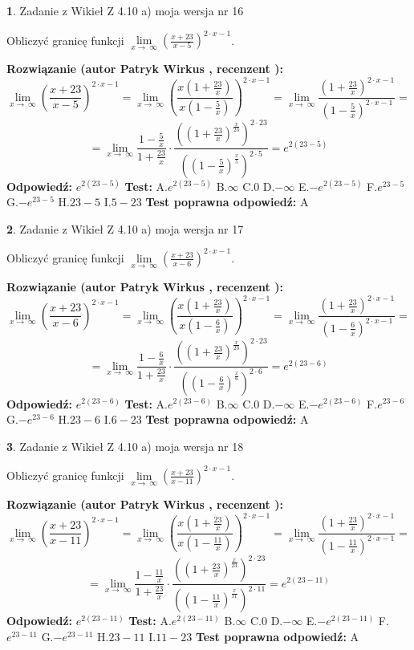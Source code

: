 \documentclass[12pt, a4paper]{article}
\theoremstyle{definition} %
\newtheorem{zad}{}
\newcommand{\zadStart}[1]{\begin{zad}#1\newline}
\newcommand{\zadStop}{\end{zad}}
\newcommand{\rozwStart}[2]{\noindent \textbf{Rozwiązanie (autor #1 , recenzent #2): }\newline}
\newcommand{\rozwStop}{\newline}
\newcommand{\odpStart}{\noindent \textbf{Odpowiedź:}\newline}
\newcommand{\odpStop}{\newline}
\newcommand{\testStart}{\noindent \textbf{Test:}\newline}
\newcommand{\testStop}{\newline}
\newcommand{\kluczStart}{\noindent \textbf{Test poprawna odpowiedź:}\newline}
\newcommand{\kluczStop}{\newline}
\begin{document}
\zadStart{Zadanie z Wikieł Z 4.10 a) moja wersja nr 16}


Obliczyć granicę funkcji  $\lim\limits_{x\to\ \infty}(\frac{x+23}{x-5})^{2\cdot x-1}$.
\zadStop
\rozwStart{Patryk Wirkus}{}
$$\lim\limits_{x\to\ \infty}(\frac{x+23}{x-5})^{2\cdot x-1} = \lim\limits_{x\to\ \infty}(\frac{x(1+\frac{23}{x})}{x(1-\frac{5}{x})})^{2\cdot x-1}=\lim\limits_{x\to\ \infty}\frac{(1+\frac{23}{x})^{2\cdot x-1}}{(1-\frac{5}{x})^{2\cdot x-1}}=$$
$$=\lim\limits_{x\to\ \infty}\frac{1-\frac{5}{x}}{1+\frac{23}{x}}\cdot\frac{((1+\frac{23}{x})^{\frac{x}{23}})^{2\cdot23}}{((1-\frac{5}{x})^{\frac{x}{5}})^{2\cdot5}}=e^{2(23-5)}$$
\rozwStop
\odpStart
$e^{2(23-5)}$
\odpStop
\testStart
A.$e^{2(23-5)}$ B.$\infty$ C.$0$ D.$-\infty$ E.$-e^{2(23-5)}$
F.$e^{23-5}$ G.$-e^{23-5}$
H.$23-5$
I.$5-23$
\testStop
\kluczStart
A
\kluczStop



\zadStart{Zadanie z Wikieł Z 4.10 a) moja wersja nr 17}


Obliczyć granicę funkcji  $\lim\limits_{x\to\ \infty}(\frac{x+23}{x-6})^{2\cdot x-1}$.
\zadStop
\rozwStart{Patryk Wirkus}{}
$$\lim\limits_{x\to\ \infty}(\frac{x+23}{x-6})^{2\cdot x-1} = \lim\limits_{x\to\ \infty}(\frac{x(1+\frac{23}{x})}{x(1-\frac{6}{x})})^{2\cdot x-1}=\lim\limits_{x\to\ \infty}\frac{(1+\frac{23}{x})^{2\cdot x-1}}{(1-\frac{6}{x})^{2\cdot x-1}}=$$
$$=\lim\limits_{x\to\ \infty}\frac{1-\frac{6}{x}}{1+\frac{23}{x}}\cdot\frac{((1+\frac{23}{x})^{\frac{x}{23}})^{2\cdot23}}{((1-\frac{6}{x})^{\frac{x}{6}})^{2\cdot6}}=e^{2(23-6)}$$
\rozwStop
\odpStart
$e^{2(23-6)}$
\odpStop
\testStart
A.$e^{2(23-6)}$ B.$\infty$ C.$0$ D.$-\infty$ E.$-e^{2(23-6)}$
F.$e^{23-6}$ G.$-e^{23-6}$
H.$23-6$
I.$6-23$
\testStop
\kluczStart
A
\kluczStop



\zadStart{Zadanie z Wikieł Z 4.10 a) moja wersja nr 18}


Obliczyć granicę funkcji  $\lim\limits_{x\to\ \infty}(\frac{x+23}{x-11})^{2\cdot x-1}$.
\zadStop
\rozwStart{Patryk Wirkus}{}
$$\lim\limits_{x\to\ \infty}(\frac{x+23}{x-11})^{2\cdot x-1} = \lim\limits_{x\to\ \infty}(\frac{x(1+\frac{23}{x})}{x(1-\frac{11}{x})})^{2\cdot x-1}=\lim\limits_{x\to\ \infty}\frac{(1+\frac{23}{x})^{2\cdot x-1}}{(1-\frac{11}{x})^{2\cdot x-1}}=$$
$$=\lim\limits_{x\to\ \infty}\frac{1-\frac{11}{x}}{1+\frac{23}{x}}\cdot\frac{((1+\frac{23}{x})^{\frac{x}{23}})^{2\cdot23}}{((1-\frac{11}{x})^{\frac{x}{11}})^{2\cdot11}}=e^{2(23-11)}$$
\rozwStop
\odpStart
$e^{2(23-11)}$
\odpStop
\testStart
A.$e^{2(23-11)}$ B.$\infty$ C.$0$ D.$-\infty$ E.$-e^{2(23-11)}$
F.$e^{23-11}$ G.$-e^{23-11}$
H.$23-11$
I.$11-23$
\testStop
\kluczStart
A
\kluczStop
\end{document}
